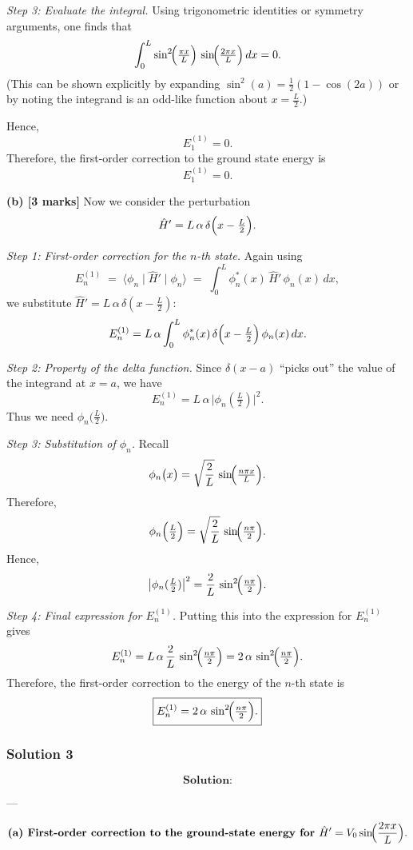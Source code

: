 \documentclass{article}
\begin{document}
\textit{Step 3: Evaluate the integral.}  
Using trigonometric identities or symmetry arguments, one finds that
\[
\int_{0}^{L} 
\sin^{2}\!\Bigl(\tfrac{\pi x}{L}\Bigr)\,
\sin\!\Bigl(\tfrac{2\pi x}{L}\Bigr)\,dx
= 0.
\]
(This can be shown explicitly by expanding \(\sin^2(a) = \tfrac{1}{2}(1 - \cos(2a))\) or by noting the integrand is an odd-like function about \(x = \tfrac{L}{2}\).)

Hence,
\[
E_1^{(1)} = 0.
\]
Therefore, the first-order correction to the ground state energy is
\[
\boxed{E_1^{(1)} = 0.}
\]

\textbf{(b) [3 marks]}  
Now we consider the perturbation
\[
\hat{H}' = L\,\alpha\,\delta\Bigl(x - \tfrac{L}{2}\Bigr).
\]

\textit{Step 1: First-order correction for the \(\!n\)-th state.}  
Again using
\[
E_n^{(1)} \;=\; \langle \phi_n \!\mid \hat{H}' \mid\! \phi_n \rangle 
\;=\; \int_{0}^{L} \phi_n^*(x)\,\hat{H}'\,\phi_n(x)\,dx,
\]
we substitute \(\hat{H}' = L\,\alpha\,\delta(x-\tfrac{L}{2})\):
\[
E_n^{(1)} 
= L\,\alpha 
\int_{0}^{L} 
\phi_n^*(x)\,\delta\Bigl(x-\tfrac{L}{2}\Bigr)\,\phi_n(x)\,dx.
\]

\textit{Step 2: Property of the delta function.}  
Since \(\delta(x-a)\) ``picks out'' the value of the integrand at \(x = a\), we have
\[
E_n^{(1)} 
= L\,\alpha \,\bigl|\phi_n(\tfrac{L}{2})\bigr|^2.
\]
Thus we need \(\phi_n\bigl(\tfrac{L}{2}\bigr)\).

\textit{Step 3: Substitution of \(\phi_n\).}  
Recall 
\[
\phi_n\bigl(x\bigr) = \sqrt{\frac{2}{L}}\,\sin\!\Bigl(\tfrac{n\pi x}{L}\Bigr).
\]
Therefore,
\[
\phi_n\Bigl(\tfrac{L}{2}\Bigr)
= \sqrt{\frac{2}{L}}\,\sin\!\Bigl(\tfrac{n\pi}{2}\Bigr).
\]
Hence,
\[
\bigl|\phi_n(\tfrac{L}{2})\bigr|^2 
= \frac{2}{L}\,\sin^2\!\Bigl(\tfrac{n\pi}{2}\Bigr).
\]

\textit{Step 4: Final expression for \(E_n^{(1)}\).}  
Putting this into the expression for \(E_n^{(1)}\) gives
\[
E_n^{(1)} 
= L\,\alpha \,\frac{2}{L}\,\sin^2\!\Bigl(\tfrac{n\pi}{2}\Bigr)
= 2\,\alpha\,\sin^2\!\Bigl(\tfrac{n\pi}{2}\Bigr).
\]
Therefore, the first-order correction to the energy of the \(n\)-th state is
\[
\boxed{E_n^{(1)} = 2\,\alpha\,\sin^2\!\Bigl(\tfrac{n\pi}{2}\Bigr).}
\]

\subsubsection{Solution 3}
\[
\textbf{Solution:}
\]

---

\[
\textbf{(a) First-order correction to the ground-state energy for } \hat{H}' = V_0 \sin\!\Bigl(\frac{2\pi x}{L}\Bigr).
\]
\end{document}
